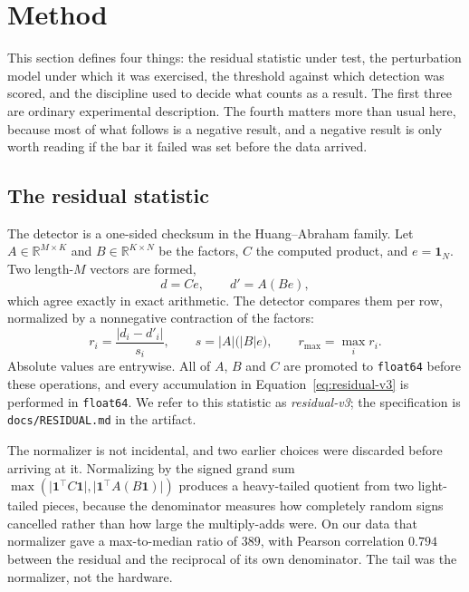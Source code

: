 
\section{Method}
\label{sec:method}

This section defines four things: the residual statistic under test, the
perturbation model under which it was exercised, the threshold against which
detection was scored, and the discipline used to decide what counts as a
result. The first three are ordinary experimental description. The fourth
matters more than usual here, because most of what follows is a negative
result, and a negative result is only worth reading if the bar it failed was
set before the data arrived.

\subsection{The residual statistic}
\label{sec:method:residual}

The detector is a one-sided checksum in the Huang--Abraham family. Let
$A \in \mathbb{R}^{M \times K}$ and $B \in \mathbb{R}^{K \times N}$ be the
factors, $C$ the computed product, and $e = \mathbf{1}_N$. Two length-$M$
vectors are formed,
%
\begin{equation}
d = C e, \qquad d' = A (B e),
\end{equation}
%
which agree exactly in exact arithmetic. The detector compares them per row,
normalized by a nonnegative contraction of the factors:
%
\begin{equation}
\label{eq:residual-v3}
r_i = \frac{\lvert d_i - d'_i \rvert}{s_i},
\qquad
s = \lvert A \rvert \bigl( \lvert B \rvert e \bigr),
\qquad
r_{\max} = \max_i r_i .
\end{equation}
%
Absolute values are entrywise. All of $A$, $B$ and $C$ are promoted to
\texttt{float64} before these operations, and every accumulation in
Equation~\ref{eq:residual-v3} is performed in \texttt{float64}. We refer to
this statistic as \emph{residual-v3}; the specification is
\texttt{docs/RESIDUAL.md} in the artifact.

The normalizer is not incidental, and two earlier choices were discarded
before arriving at it. Normalizing by the signed grand sum
$\max(\lvert \mathbf{1}^{\!\top} C \mathbf{1} \rvert,
\lvert \mathbf{1}^{\!\top} A (B\mathbf{1}) \rvert)$ produces a heavy-tailed
quotient from two light-tailed pieces, because the denominator measures how
completely random signs cancelled rather than how large the multiply-adds
were. On our data that normalizer gave a max-to-median ratio of $389$, with
Pearson correlation $0.794$ between the residual and the reciprocal of its own
denominator. The tail was the normalizer, not the hardware.

